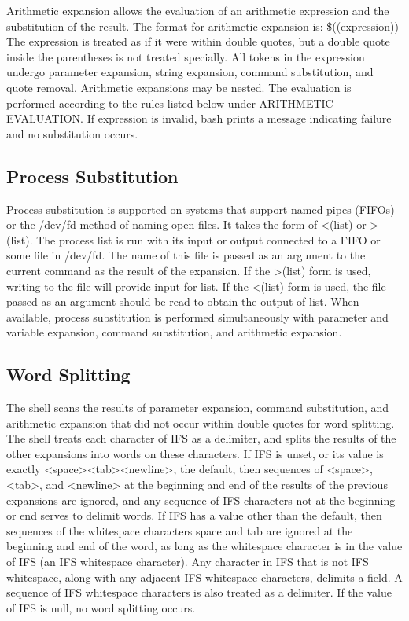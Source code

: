 Arithmetic expansion allows the evaluation of an arithmetic expression and the substitution of the result. The format for arithmetic expansion is:
\$((expression))
The expression is treated as if it were within double quotes, but a double quote inside the parentheses is not treated specially. All tokens in the expression undergo parameter expansion, string expansion, command substitution, and quote removal. Arithmetic expansions may be nested.
The evaluation is performed according to the rules listed below under ARITHMETIC EVALUATION. If expression is invalid, bash prints a message indicating failure and no substitution occurs.

\subsection{Process Substitution}\label{sec:processsubstitution}

Process substitution is supported on systems that support named pipes (FIFOs) or the /dev/fd method of naming open files. It takes the form of <(list) or >(list). The process list is run with its input or output connected to a FIFO or some file in /dev/fd. The name of this file is passed as an argument to the current command as the result of the expansion. If the >(list) form is used, writing to the file will provide input for list. If the <(list) form is used, the file passed as an argument should be read to obtain the output of list.
When available, process substitution is performed simultaneously with parameter and variable expansion, command substitution, and arithmetic expansion.

\subsection{Word Splitting}\label{sec:wordsplitting}

The shell scans the results of parameter expansion, command substitution, and arithmetic expansion that did not occur within double quotes for word splitting.
The shell treats each character of IFS as a delimiter, and splits the results of the other expansions into words on these characters. If IFS is unset, or its value is exactly <space><tab><newline>, the default, then sequences of <space>, <tab>, and <newline> at the beginning and end of the results of the previous expansions are ignored, and any sequence of IFS characters not at the beginning or end serves to delimit words. If IFS has a value other than the default, then sequences of the whitespace characters space and tab are ignored at the beginning and end of the word, as long as the whitespace character is in the value of IFS (an IFS whitespace character). Any character in IFS that is not IFS whitespace, along with any adjacent IFS whitespace characters, delimits a field. A sequence of IFS whitespace characters is also treated as a delimiter. If the value of IFS is null, no word splitting occurs.

